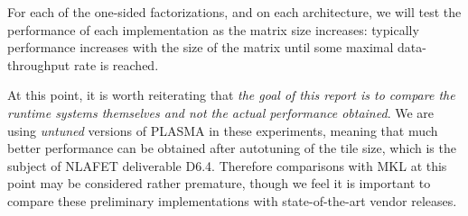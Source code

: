 \documentclass[a4paper,12pt]{article}
\begin{document}
For each of the one-sided factorizations,
and on each architecture,
we will test the performance of each implementation
as the matrix size increases:
typically performance increases with the size of the matrix until
some maximal data-throughput rate is reached.

At this point,
it is worth reiterating that \emph{the goal of this report is to
compare the runtime systems themselves
and not the actual performance obtained}.
We are using \emph{untuned} versions of PLASMA in these experiments,
meaning that much better performance can be obtained
after autotuning of the tile size,
which is the subject of NLAFET deliverable D6.4.
Therefore comparisons with MKL at this point
may be considered rather premature,
though we feel it is important to compare these preliminary implementations
with state-of-the-art vendor releases.

\end{document}
